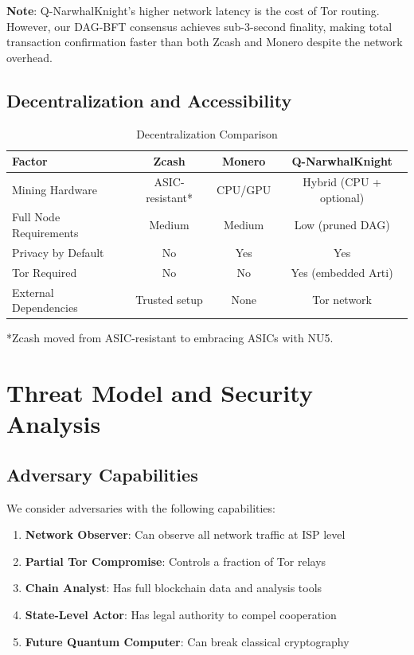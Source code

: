 \documentclass[11pt,a4paper]{article}
\begin{document}
\textbf{Note}: Q-NarwhalKnight's higher network latency is the cost of Tor routing. However, our DAG-BFT consensus achieves sub-3-second finality, making total transaction confirmation faster than both Zcash and Monero despite the network overhead.

\subsection{Decentralization and Accessibility}

\begin{table}[H]
\centering
\caption{Decentralization Comparison}
\label{tab:decentralization}
\begin{tabular}{@{}lccc@{}}
\toprule
\textbf{Factor} & \textbf{Zcash} & \textbf{Monero} & \textbf{Q-NarwhalKnight} \\
\midrule
Mining Hardware & ASIC-resistant* & CPU/GPU & Hybrid (CPU + optional) \\
Full Node Requirements & Medium & Medium & Low (pruned DAG) \\
Privacy by Default & No & Yes & Yes \\
Tor Required & No & No & Yes (embedded Arti) \\
External Dependencies & Trusted setup & None & Tor network \\
\bottomrule
\end{tabular}
\end{table}

*Zcash moved from ASIC-resistant to embracing ASICs with NU5.

\section{Threat Model and Security Analysis}

\subsection{Adversary Capabilities}

We consider adversaries with the following capabilities:

\begin{enumerate}[leftmargin=*]
    \item \textbf{Network Observer}: Can observe all network traffic at ISP level
    \item \textbf{Partial Tor Compromise}: Controls a fraction of Tor relays
    \item \textbf{Chain Analyst}: Has full blockchain data and analysis tools
    \item \textbf{State-Level Actor}: Has legal authority to compel cooperation
    \item \textbf{Future Quantum Computer}: Can break classical cryptography
\end{enumerate}
\end{document}
